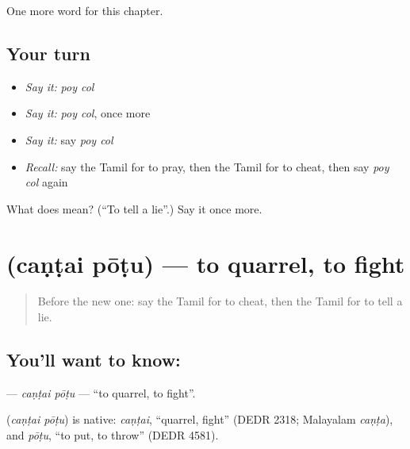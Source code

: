 \begin{grammarlens}[title={What you've built}]
One more word for this chapter.
\end{grammarlens}

\subsection*{Your turn}
\begin{itemize}
\raggedright
  \item \emph{Say it:} \emph{poy col}
  \item \emph{Say it:} \emph{poy col}, once more
  \item \emph{Say it:} say \emph{poy col}
  \item \emph{Recall:} say the Tamil for to pray, then the Tamil for to cheat, then say \emph{poy col} again
\end{itemize}

\begin{tcolorbox}[breakable,colback=teal!4,colframe=teal!35!black,title={Before you move on}]
What does   mean? (\textquotedblleft{}To tell a lie\textquotedblright{}.) Say it once more.
\end{tcolorbox}
\section[\texorpdfstring{\ta{சண்டை} \ta{போடு} (caṇṭai pōṭu)}{சண்டை போடு (caṇṭai pōṭu)}]{  (caṇṭai pōṭu) — to quarrel, to fight}

\label{lesson:TA-C198-cantai-potu}



\begin{quote}
Before the new one: say the Tamil for to cheat, then the Tamil for to tell a lie.
\end{quote}

\subsection*{You'll want to know:  }
\textbf{ } — \emph{caṇṭai pōṭu} — \textquotedblleft{}to quarrel, to fight\textquotedblright{}.

\begin{cousinweb}
\textbf{ } (\emph{caṇṭai pōṭu}) is native: \emph{caṇṭai}, \textquotedblleft{}quarrel, fight\textquotedblright{} (DEDR 2318; Malayalam \emph{caṇṭa}), and \emph{pōṭu}, \textquotedblleft{}to put, to throw\textquotedblright{} (DEDR 4581).
\end{cousinweb}

